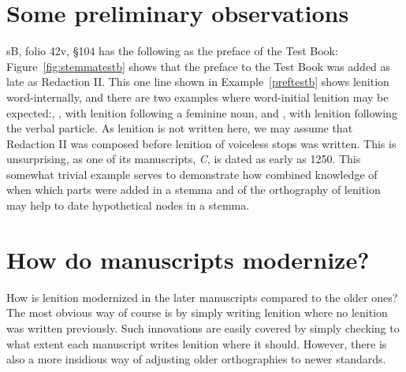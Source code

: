 \section{Some preliminary observations}
\label{sec:some-prel-observ}

\gls{sB}, folio 42v, \S 104 has the following as the preface of the Test Book:
Figure~\ref{fig:stemmatestb} shows that the preface to the Test Book was added as late as Redaction II.
This one line shown in Example~\ref{preftestb} shows lenition word-internally, and there are two examples  where word-initial lenition may be expected:, , with lenition following a feminine noun, and , with lenition following the verbal particle.
As lenition  is not written here, we may assume that Redaction II was composed before lenition of voiceless stops was written.
This is unsurprising, as one of its manuscripts, \textit{C}, is dated as early as 1250.
This somewhat trivial example serves to demonstrate how combined knowledge of when which parts were added in a stemma and of the orthography of lenition may help to date hypothetical nodes in a stemma. 


\section{How do manuscripts modernize?}
\label{sec:how-do-manuscripts}

How is lenition modernized in the later manuscripts compared to the older ones?
The most obvious way of course is by simply writing lenition where no lenition was written previously. Such innovations are easily covered by simply checking to what extent each manuscript writes lenition where it should. However, there is also a more insidious way of adjusting older orthographies to newer standards.

